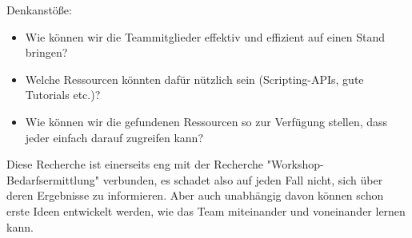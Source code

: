 Denkanstöße:
\begin{itemize}
\item Wie können wir die Teammitglieder effektiv und effizient auf einen Stand bringen?
\item Welche Ressourcen könnten dafür nützlich sein (Scripting-APIs, gute Tutorials etc.)?
\item Wie können wir die gefundenen Ressourcen so zur Verfügung stellen, dass jeder einfach darauf zugreifen kann?
\end{itemize}
Diese Recherche ist einerseits eng mit der Recherche "Workshop-Bedarfsermittlung" verbunden, es schadet also auf jeden Fall nicht, sich über deren Ergebnisse zu informieren. Aber auch unabhängig davon können schon erste Ideen entwickelt werden, wie das Team miteinander und voneinander lernen kann.
\nsecend


